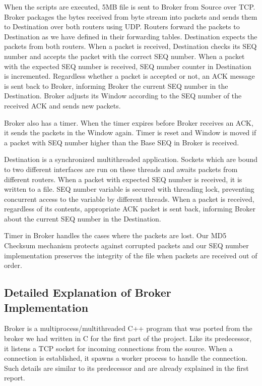 \documentclass[conference]{IEEEtran}
\begin{document}
When the scripts are executed, 5MB file is sent to Broker from Source over TCP. Broker packages the bytes received from byte stream into packets and sends them to Destination over both routers using UDP. Routers forward the packets to Destination as we have defined in their forwarding tables. Destination expects the packets from both routers. When a packet is received, Destination checks its SEQ number and accepts the packet with the correct SEQ number. When a packet with the expected SEQ number is received, SEQ number counter in Destination is incremented. Regardless whether a packet is accepted or not, an ACK message is sent back to Broker, informing Broker the current SEQ number in the Destination. Broker adjusts its Window according to the SEQ number of the received ACK and sends new packets.

Broker also has a timer. When the timer expires before Broker receives an ACK, it sends the packets in the Window again. Timer is reset and Window is moved if a packet with SEQ number higher than the Base SEQ in Broker is received.

Destination is a synchronized multithreaded application. Sockets which are bound to two different interfaces are run on these threads and awaits packets from different routers. When a packet with expected SEQ number is received, it is written to a file. SEQ number variable is secured with threading lock, preventing concurrent access to the variable by different threads. When a packet is received, regardless of its contents, appropriate ACK packet is sent back, informing Broker about the current SEQ number in the Destination.

Timer in Broker handles the cases where the packets are lost. Our MD5 Checksum mechanism protects against corrupted packets and our SEQ number implementation preserves the integrity of the file when packets are received out of order.

\subsection{Detailed Explanation of Broker Implementation}

Broker is a multiprocess/multithreaded C++ program that was ported from the broker
we had written in C for the first part of the project. Like its predecessor,
it listens a TCP socket for incoming connections from the source. When a connection
is established, it spawns a worker process to handle the connection. Such details
are similar to its predecessor and are already explained in the first report.
\end{document}
